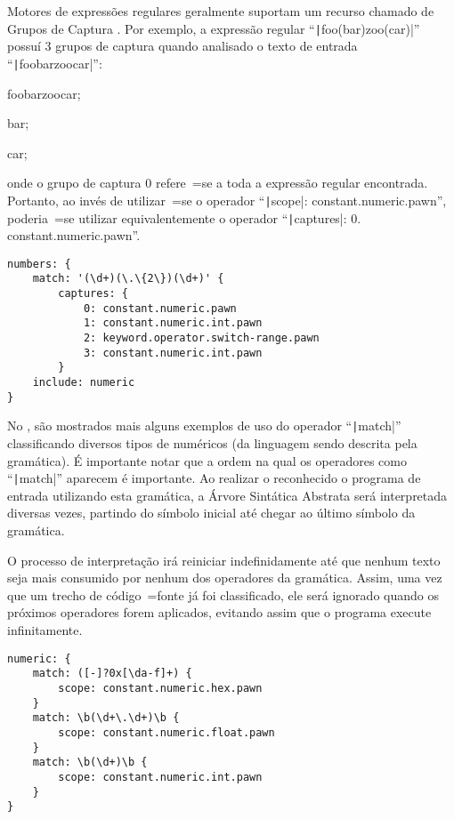 Motores de expressões regulares geralmente suportam um recurso chamado de Grupos de Captura \cite{expressionGrammarsWithRegexLikeCaptures}.
Por exemplo,
a expressão regular ``\texttt|foo(bar)zoo(car)|'' possuí 3 grupos de captura quando analisado o texto de entrada ``\texttt|foobarzoocar|'':
\begin{inparaenum}[1)]\setcounter{enumi}{-1}
\item foobarzoocar;
\item bar;
\item car;
\end{inparaenum}%
onde o grupo de captura 0 refere~=se a toda a expressão regular encontrada.
Portanto,
ao invés de utilizar~=se o operador ``\texttt|scope|:
constant.numeric.pawn'',
poderia~=se utilizar equivalentemente o operador ``\texttt|captures|:
0.
constant.numeric.pawn''.
\begin{lstlisting}[caption={Exemplo de Gramática, Grupos de Captura},label={code:exemploDeGramaticaPawn3},style=yaml_style]
numbers: {
    match: '(\d+)(\.\{2\})(\d+)' {
        captures: {
            0: constant.numeric.pawn
            1: constant.numeric.int.pawn
            2: keyword.operator.switch-range.pawn
            3: constant.numeric.int.pawn
        }
    include: numeric
}
\end{lstlisting}

No ,
são mostrados mais alguns exemplos de uso do operador ``\texttt|match|'' classificando diversos tipos de numéricos (da linguagem sendo descrita pela gramática).
É importante notar que a ordem na qual os operadores como ``\texttt|match|'' aparecem é importante.
Ao realizar o reconhecido o programa de entrada utilizando esta gramática,
a Árvore Sintática Abstrata \cite{ahoCompilerDragonBook} será interpretada diversas vezes,
partindo do símbolo inicial até chegar ao último símbolo da gramática.

O processo de interpretação irá reiniciar indefinidamente até que nenhum texto seja mais consumido por nenhum dos operadores da gramática.
Assim,
uma vez que um trecho de código~=fonte já foi classificado,
ele será ignorado quando os próximos operadores forem aplicados,
evitando assim que o programa execute infinitamente.
\begin{lstlisting}[caption={Exemplo de Gramática, Tipos numéricos},label={code:exemploDeGramaticaPawn4},style=yaml_style]
numeric: {
    match: ([-]?0x[\da-f]+) {
        scope: constant.numeric.hex.pawn
    }
    match: \b(\d+\.\d+)\b {
        scope: constant.numeric.float.pawn
    }
    match: \b(\d+)\b {
        scope: constant.numeric.int.pawn
    }
}
\end{lstlisting}

